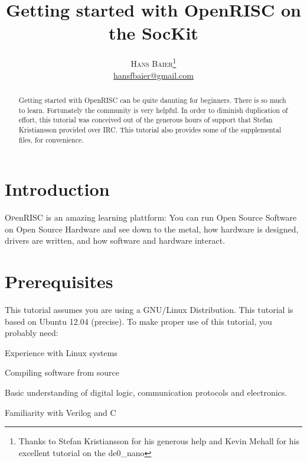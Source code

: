 \documentclass[twoside]{article}
\title{\vspace{-15mm}\fontsize{24pt}{10pt}\selectfont\textbf{Getting
    started with OpenRISC on the SocKit}} %
\author{
\large
\textsc{Hans Baier}\thanks{Thanks to Stefan Kristiansson for his
  generous help and Kevin Mehall for his excellent tutorial on the de0\_nano}\\[2mm] 
\normalsize \href{mailto:hansfbaier@gmail.com}{hansfbaier@gmail.com} %
\vspace{-5mm}
}
\date{}
\begin{document}
\maketitle %

\thispagestyle{fancy} %


\begin{abstract}

  \noindent Getting started with OpenRISC can be quite daunting for
  beginners. There is so much to learn. Fortunately the community is
  very helpful. In order to diminish duplication of effort, this
  tutorial was conceived out of the generous hours of support that
  Stefan Kristiansson provided over IRC. This tutorial also provides
  some of the supplemental files, for convenience.

\end{abstract}



\section{Introduction}

\lettrine[nindent=0em,lines=3]{O} penRISC is an amazing learning
plattform: You can run Open Source Software on Open Source Hardware
and see down to the metal, how hardware is designed, drivers are
written, and how software and hardware interact.  


\section{Prerequisites}
This tutorial assumes you are using a GNU/Linux Distribution. This
tutorial is based on Ubuntu 12.04 (precise). To make proper use of
this tutorial, you probably need:

\begin{compactitem}
\item Experience with Linux systems
\item Compiling software from source
\item Basic understanding of digital logic, communication protocols
  and electronics.
\item Familiarity with Verilog and C
\end{compactitem}
\end{document}

